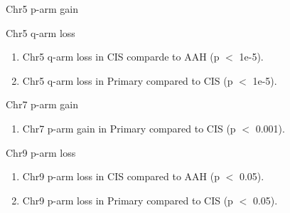 \documentclass{beamer}
\begin{document}
\begin{frame}[allowframebreaks]
\begin{block}{Chr5 p-arm gain}
                    \begin{table}
                        \caption{CGC Tier1 genes in Chr5 p-arm}
                        \resizebox{\linewidth}{!}
                        {}
                    \end{table}
                \end{block}

                \begin{block}{Chr5 q-arm loss}
                    \begin{enumerate}
                        \item Chr5 q-arm loss in CIS comparde to AAH (p $<$ 1e-5).
                        \item Chr5 q-arm loss in Primary compared to CIS (p $<$ 1e-5).
                    \end{enumerate}

                    \begin{table}
                        \caption{CGC Tier1 genes in Ch5 q-arm}
                        \resizebox{\linewidth}{!}
                        {}
                    \end{table}
                \end{block}

                \begin{block}{Chr7 p-arm gain}
                    \begin{enumerate}
                        \item Chr7 p-arm gain in Primary compared to CIS (p $<$ 0.001).
                    \end{enumerate}

                    \begin{table}
                        \caption{CGC Tier1 genes in Chr7 p-arm}
                        \resizebox{\linewidth}{!}
                        {}
                    \end{table}
                \end{block}

                \begin{block}{Chr9 p-arm loss}
                    \begin{enumerate}
                        \item Chr9 p-arm loss in CIS compared to AAH (p $<$ 0.05).
                        \item Chr9 p-arm loss in Primary compared to CIS (p $<$ 0.05).
                    \end{enumerate}


\end{block}
\end{frame}
\end{document}
